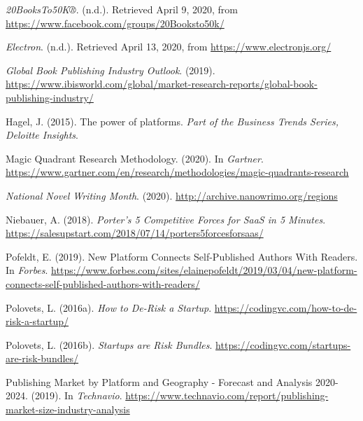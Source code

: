 \documentclass[11pt,openany]{book}
\newlength{\cslhangindent}
\newenvironment{cslreferences}%
  {\setlength{\parindent}{0pt}%
  \everypar{\setlength{\hangindent}{\cslhangindent}}\ignorespaces}%
  {\par}
\begin{document}
\hypertarget{refs}{}
\begin{cslreferences}
\leavevmode\hypertarget{ref-noauthor_20booksto50k_nodate}{}%
\emph{20BooksTo50K®}. (n.d.). Retrieved April 9, 2020, from
\url{https://www.facebook.com/groups/20Booksto50k/}

\leavevmode\hypertarget{ref-ElectronBuildCrossplatform}{}%
\emph{Electron}. (n.d.). Retrieved April 13, 2020, from
\url{https://www.electronjs.org/}

\leavevmode\hypertarget{ref-noauthor_ibisworld_nodate}{}%
\emph{Global Book Publishing Industry Outlook}. (2019).
\url{https://www.ibisworld.com/global/market-research-reports/global-book-publishing-industry/}

\leavevmode\hypertarget{ref-hagel_power_2015}{}%
Hagel, J. (2015). The power of platforms. \emph{Part of the Business
Trends Series, Deloitte Insights}.

\leavevmode\hypertarget{ref-gartner_magic_nodate}{}%
Magic Quadrant Research Methodology. (2020). In \emph{Gartner}.
\url{https://www.gartner.com/en/research/methodologies/magic-quadrants-research}

\leavevmode\hypertarget{ref-noauthor_national_nodate}{}%
\emph{National Novel Writing Month}. (2020).
\url{http://archive.nanowrimo.org/regions}

\leavevmode\hypertarget{ref-annelise_porters_nodate}{}%
Niebauer, A. (2018). \emph{Porter's 5 Competitive Forces for SaaS in 5
Minutes}.
\url{https://salesupstart.com/2018/07/14/porters5forcesforsaas/}

\leavevmode\hypertarget{ref-pofeldt_new_nodate}{}%
Pofeldt, E. (2019). New Platform Connects Self-Published Authors With
Readers. In \emph{Forbes}.
\url{https://www.forbes.com/sites/elainepofeldt/2019/03/04/new-platform-connects-self-published-authors-with-readers/}

\leavevmode\hypertarget{ref-polovets_how_nodate}{}%
Polovets, L. (2016a). \emph{How to De-Risk a Startup}.
\url{https://codingvc.com/how-to-de-risk-a-startup/}

\leavevmode\hypertarget{ref-polovets_startups_nodate}{}%
Polovets, L. (2016b). \emph{Startups are Risk Bundles}.
\url{https://codingvc.com/startups-are-risk-bundles/}

\leavevmode\hypertarget{ref-technavio_publishing_nodate}{}%
Publishing Market by Platform and Geography - Forecast and Analysis
2020-2024. (2019). In \emph{Technavio}.
\url{https://www.technavio.com/report/publishing-market-size-industry-analysis}


\end{cslreferences}
\end{document}
